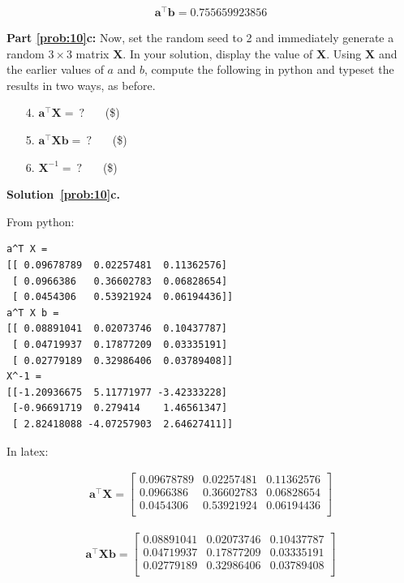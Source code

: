 \documentclass[10pt]{article}
\begin{document}
\begin{enumerate}
\begin{eqnarray*}
\mathbf{a}^\top \mathbf{b} = 0.755659923856
\end{eqnarray*}

{\bf Part \ref{prob:10}c:} Now, set the random seed to 2 and immediately generate a random $3 \times 3$ matrix $\mathbf{X}$.  In your solution, display the value of $\mathbf{X}$.  Using $\mathbf{X}$ and the earlier values of $a$ and $b$, compute the following in python and typeset the results in two ways, as before.
\begin{enumerate}
\item[4.] $\mathbf{a}^\top\mathbf{X} = ~?$ ~~~(\$)
\item[5.] $\mathbf{a}^\top\mathbf{X}\mathbf{b} = ~?$ ~~~(\$)
\item[6.] $\mathbf{X}^{-1} = ~?$ ~~~(\$)
\end{enumerate}

{\bf Solution~\ref{prob:10}c.} 

From python:

\begin{verbatim}
a^T X =
[[ 0.09678789  0.02257481  0.11362576]
 [ 0.0966386   0.36602783  0.06828654]
 [ 0.0454306   0.53921924  0.06194436]]
a^T X b =
[[ 0.08891041  0.02073746  0.10437787]
 [ 0.04719937  0.17877209  0.03335191]
 [ 0.02779189  0.32986406  0.03789408]]
X^-1 =
[[-1.20936675  5.11771977 -3.42333228]
 [-0.96691719  0.279414    1.46561347]
 [ 2.82418088 -4.07257903  2.64627411]]
\end{verbatim}

In latex:

\begin{eqnarray*}
\mathbf{a}^\top\mathbf{X} =
    \begin{bmatrix}
    0.09678789 & 0.02257481 & 0.11362576 \\[0.3em]
    0.0966386 &  0.36602783 & 0.06828654 \\[0.3em]
    0.0454306 &  0.53921924 & 0.06194436 \\[0.3em]
    \end{bmatrix}
\end{eqnarray*}

\begin{eqnarray*}
\mathbf{a}^\top\mathbf{X}\mathbf{b} =
    \begin{bmatrix}
    0.08891041 & 0.02073746 & 0.10437787 \\[0.3em]
    0.04719937 & 0.17877209 & 0.03335191 \\[0.3em]
    0.02779189 & 0.32986406 & 0.03789408 \\[0.3em]
    \end{bmatrix}
\end{eqnarray*}


\end{enumerate}
\end{document}
